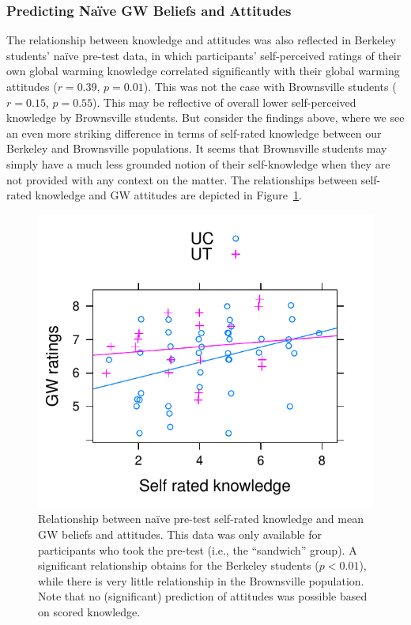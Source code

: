 \subsubsection{Predicting Na\"ive GW Beliefs and Attitudes}

The relationship between knowledge and attitudes was also reflected in Berkeley
students’ naïve pre-test data, in which participants’ self-perceived ratings of
their own global warming knowledge correlated significantly with their global
warming attitudes ($r = 0.39$, $p = 0.01$). This was not the case with
Brownsville students ($r = 0.15$, $p = 0.55$). This may be reflective of overall
lower self-perceived knowledge by Brownsville students. But consider the
findings above, where we see an even more striking difference in terms of
self-rated knowledge between our Berkeley and Brownsville populations. It seems
that Brownsville students may simply have a much less grounded notion of their
self-knowledge when they are not provided with any context on the matter. The
relationships between self-rated knowledge and GW attitudes are depicted in
Figure~\ref{fig:class-predicting-gw}.

\begin{figure}
    \centering
    \includegraphics{class-predicting-gw.pdf}
    \caption{Relationship between na\"ive pre-test self-rated knowledge and mean GW
        beliefs and attitudes. This data was only available for participants who
    took the pre-test (i.e., the “sandwich” group). A significant relationship
    obtains for the Berkeley students ($p < 0.01$), while there is very little
    relationship in the Brownsville population. Note that no (significant)
    prediction of attitudes was possible based on scored knowledge.}
    \label{fig:class-predicting-gw}
\end{figure}

